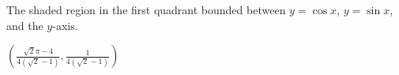 {The shaded region in the first quadrant bounded between $y=\cos x$, $y=\sin x$, and the $y$-axis.\\

\noindent\begin{minipage}{\linewidth}
\centering
{}
\end{minipage}
}
{$\left( \frac{\sqrt2 \pi - 4}{4\left(\sqrt2 - 1\right)}, \frac{1}{4\left(\sqrt2 - 1\right)} \right)$
}

